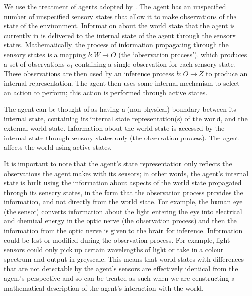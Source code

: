 We use the treatment of agents adopted by \autocite{Higgins2018}.
The agent has an unspecified number of unspecified sensory states that allow it to make observations of the state of the environment.
Information about the world state that the agent is currently in is delivered to the internal state
 of the agent through the sensory states.
Mathematically, the process of information propagating through the sensory states is a mapping $b : W \to O$ (the `observation process'), which produces a set of observations $o_1$ containing a single observation for each sensory state.
These observations are then used by an inference process $h : O \to Z$ to produce an internal representation.
The agent then uses some internal mechanism to select an action to perform; this action is performed through active states.

The agent can be thought of as having a (non-physical) boundary between its internal state, containing its internal state representation(s) of the world, and the external world state.
Information about the world state is accessed by the internal state through sensory states only (the observation process).
The agent affects the world using active states.

It is important to note that the agent's state representation only reflects the observations the agent makes with its sensors; in other words, the agent's internal state is built using the information about aspects of the world state propagated through its sensory states, in the form that the observation process provides the information, and not directly from the world state.
For example, the human eye (the sensor) converts information about the light entering the eye into electrical and chemical energy in the optic nerve (the observation process) and then the information from the optic nerve is given to the brain for inference.
Information could be lost or modified during the observation process.
For example, light sensors could only pick up certain wavelengths of light or take in a colour spectrum and output in greyscale.
This means that world states with differences that are not detectable by the agent's sensors are effectively identical from the agent's perspective and so can be treated as such when we are constructing a mathematical description of the agent's interaction with the world.

